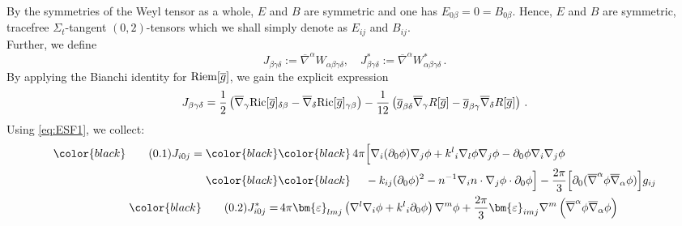 \documentclass[11pt,leqno,textwidth=10cm]{amsart}
\numberwithin{equation}{section}
\theoremstyle{definition}
\theoremstyle{plain}
\newcommand{\1}{\mathbbm{1}}
\newcommand{\g}{\overline{g}}
\newcommand{\nabbar}{\overline{\nabla}}
\newcommand{\Ric}{\text{\normalfont{Ric}}}
\newcommand{\Riem}{\text{\normalfont{Riem}}}
\renewcommand{\epsilon}{\varepsilon}
\newcommand{\del}{\partial}
\newcommand{\numberthis}{\addtocounter{equation}{1}\tag{\theequation}}
\renewcommand{\theequation}{\arabic{section}.\arabic{equation}}
\newcommand{\epsilonLC}{\bm{\epsilon}}
\newcommand{\change}[1]{\color{black}#1\color{black}}
\begin{document}
By the symmetries of the Weyl tensor as a whole, $E$ and $B$ are symmetric and one has $E_{0\beta}=0=B_{0\beta}$. Hence, $E$ and $B$ are symmetric, tracefree $\Sigma_t$-tangent $(0,2)$-tensors which we shall simply denote as $E_{ij}$ and $B_{ij}$.\\
Further, we define
\begin{equation}
J_{\beta\gamma\delta}:=\nabbar^\alpha W_{\alpha\beta\gamma\delta},\quad J^\ast_{\beta\gamma\delta}:=\nabbar^\alpha W^\ast_{\alpha\beta\gamma\delta}\,.
\end{equation}
By applying the Bianchi identity for $\Riem[\g]$, we gain the explicit expression
\begin{equation}
J_{\beta\gamma\delta}=\frac12\left(\nabbar_\gamma \Ric[\g]_{\delta\beta}-\nabbar_\delta \Ric[\g]_{\gamma\beta}\right)-\frac1{12}\left(\g_{\beta\delta}\nabbar_\gamma R[\g]-\g_{\beta\gamma}\nabbar_\delta R[\g]\right)\,.
\end{equation}
Using \eqref{eq:ESF1}, we collect:
\begin{align*}
\change{\numberthis\label{eq:J}J_{i0j}%
=}&\change{\,4\pi\Bigr[\nabla_i(\del_0\phi)\nabla_j\phi+{k^l}_i\nabla_l\phi\nabla_j\phi-\del_0\phi\nabla_i\nabla_j\phi\\}
&\change{\,\phantom{4\pi}-k_{ij}(\del_0\phi)^2-n^{-1}\nabla_in\cdot\nabla_j\phi\cdot\del_0\phi\Bigr]-\frac{2\pi}3\Bigr[\del_0(\nabbar^\alpha\phi\nabbar_\alpha\phi)\Bigr]g_{ij}\\}
\numberthis\label{eq:Jast}J^\ast_{i0j}%
=&\,4\pi\epsilonLC_{lmj}\left(\nabla^l\nabla_i\phi+{k^l}_i\del_0\phi\right)\nabla^m\phi+\frac{2\pi}3\epsilonLC_{imj}\nabla^m\left(\nabbar^\alpha\phi\nabbar_\alpha\phi\right)
\end{align*}
\end{document}
